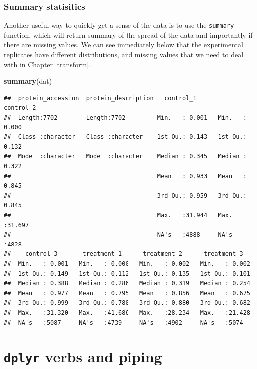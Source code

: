\documentclass[12pt,]{book}
\newenvironment{Shaded}{\begin{snugshade}}{\end{snugshade}}
\newcommand{\KeywordTok}[1]{\textcolor[rgb]{0.13,0.29,0.53}{\textbf{#1}}}
\newcommand{\NormalTok}[1]{#1}
\theoremstyle{definition}
\theoremstyle{definition}
\theoremstyle{definition}
\theoremstyle{remark}
\begin{document}
\subsection{Summary statisitics}\label{summary-statisitics}

Another useful way to quickly get a sense of the data is to use the
\texttt{summary} function, which will return summary of the spread of
the data and importantly if there are missing values. We can see
immediately below that the experimental replicates have different
distributions, and missing values that we need to deal with in Chapter
\ref{transform}.

\begin{Shaded}
\begin{Highlighting}[]
\KeywordTok{summary}\NormalTok{(dat)}
\end{Highlighting}
\end{Shaded}

\begin{verbatim}
##  protein_accession  protein_description   control_1        control_2     
##  Length:7702        Length:7702         Min.   : 0.001   Min.   : 0.000  
##  Class :character   Class :character    1st Qu.: 0.143   1st Qu.: 0.132  
##  Mode  :character   Mode  :character    Median : 0.345   Median : 0.322  
##                                         Mean   : 0.933   Mean   : 0.845  
##                                         3rd Qu.: 0.959   3rd Qu.: 0.845  
##                                         Max.   :31.944   Max.   :31.697  
##                                         NA's   :4888     NA's   :4828    
##    control_3       treatment_1      treatment_2      treatment_3    
##  Min.   : 0.001   Min.   : 0.000   Min.   : 0.002   Min.   : 0.002  
##  1st Qu.: 0.149   1st Qu.: 0.112   1st Qu.: 0.135   1st Qu.: 0.101  
##  Median : 0.388   Median : 0.286   Median : 0.319   Median : 0.254  
##  Mean   : 0.977   Mean   : 0.795   Mean   : 0.856   Mean   : 0.675  
##  3rd Qu.: 0.999   3rd Qu.: 0.780   3rd Qu.: 0.880   3rd Qu.: 0.682  
##  Max.   :31.320   Max.   :41.686   Max.   :28.234   Max.   :21.428  
##  NA's   :5087     NA's   :4739     NA's   :4902     NA's   :5074
\end{verbatim}

\chapter{\texorpdfstring{\texttt{dplyr} verbs and
piping}{dplyr verbs and piping}}\label{dplyr}
\end{document}
